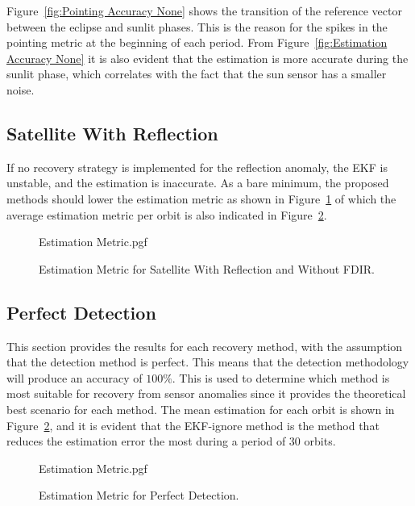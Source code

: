 \documentclass[letterpaper, 10 pt, conference]{ieeeconf}  %
\begin{document}
Figure~\ref{fig:Pointing Accuracy None} shows the transition of the reference vector between the eclipse and sunlit phases. This is the reason for the spikes in the pointing metric at the beginning of each period. From Figure~\ref{fig:Estimation Accuracy None} it is also evident that the estimation is more accurate during the sunlit phase, which correlates with the fact that the sun sensor has a smaller noise.

\subsection{Satellite With Reflection}
If no recovery strategy is implemented for the reflection anomaly, the EKF is unstable, and the estimation is inaccurate. As a bare minimum, the proposed methods should lower the estimation metric as shown in Figure~\ref{fig:Estimation Accuracy Reflection} of which the average estimation metric per orbit is also indicated in Figure~\ref{fig:Estimation Metric Summary}. 

\begin{figure}[!htb]
	\begin{center}
		{Estimation Metric.pgf}
	\end{center}
	\caption[Estimation Metric for Satellite with Reflection and without FDIR]{Estimation Metric for Satellite With Reflection and Without FDIR.}
	\label{fig:Estimation Accuracy Reflection}
\end{figure}

\subsection{Perfect Detection}
This section provides the results for each recovery method, with the assumption that the detection method is perfect. This means that the detection methodology will produce an accuracy of $100\%$. This is used to determine which method is most suitable for recovery from sensor anomalies since it provides the theoretical best scenario for each method. The mean estimation for each orbit is shown in Figure~\ref{fig:Estimation Metric Summary}, and it is evident that the EKF-ignore method is the method that reduces the estimation error the most during a period of $30$ orbits. 

\begin{figure}[!htb]
	\begin{center}
		{Estimation Metric.pgf}
	\end{center}
	\caption[Estimation Metric for Perfect Detection]{Estimation Metric for Perfect Detection.}
	\label{fig:Estimation Metric Summary}
\end{figure}
\end{document}
